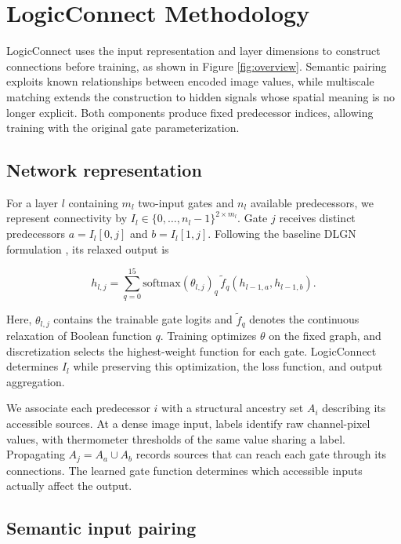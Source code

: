 
\section{LogicConnect Methodology}
\label{sec:method}

LogicConnect uses the input representation and layer dimensions to construct connections before training, as shown in Figure \ref{fig:overview}. Semantic pairing exploits known relationships between encoded image values, while multiscale matching extends the construction to hidden signals whose spatial meaning is no longer explicit. Both components produce fixed predecessor indices, allowing training with the original gate parameterization.



\subsection{Network representation}

For a layer $l$ containing $m_l$ two-input gates and $n_l$ available predecessors, we represent connectivity by $I_l\in\{0,\ldots,n_l-1\}^{2\times m_l}$. Gate $j$ receives distinct predecessors $a=I_l[0,j]$ and $b=I_l[1,j]$. Following the baseline DLGN formulation \cite{petersen2022}, its relaxed output is

\begin{equation}
h_{l,j}=\sum_{q=0}^{15}\mathrm{softmax}(\theta_{l,j})_q\,\widetilde f_q(h_{l-1,a},h_{l-1,b}).
\label{eq:gate}
\end{equation}

Here, $\theta_{l,j}$ contains the trainable gate logits and $\widetilde f_q$ denotes the continuous relaxation of Boolean function $q$. Training optimizes $\theta$ on the fixed graph, and discretization selects the highest-weight function for each gate. LogicConnect determines $I_l$ while preserving this optimization, the loss function, and output aggregation.

We associate each predecessor $i$ with a structural ancestry set $A_i$ describing its accessible sources. At a dense image input, labels identify raw channel-pixel values, with thermometer thresholds of the same value sharing a label. Propagating $A_j=A_a\cup A_b$ records sources that can reach each gate through its connections. The learned gate function determines which accessible inputs actually affect the output.

\subsection{Semantic input pairing}

